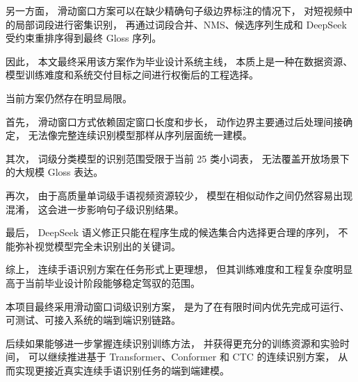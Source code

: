另一方面，
滑动窗口方案可以在缺少精确句子级边界标注的情况下，
对短视频中的局部词段进行密集识别，
再通过词段合并、NMS、候选序列生成和 DeepSeek 受约束重排序得到最终 Gloss 序列。

因此，
本文最终采用该方案作为毕业设计系统主线，
本质上是一种在数据资源、模型训练难度和系统交付目标之间进行权衡后的工程选择。

当前方案仍然存在明显局限。

首先，
滑动窗口方式依赖固定窗口长度和步长，
动作边界主要通过后处理间接确定，
无法像完整连续识别模型那样从序列层面统一建模。

其次，
词级分类模型的识别范围受限于当前 25 类小词表，
无法覆盖开放场景下的大规模 Gloss 表达。

再次，
由于高质量单词级手语视频资源较少，
模型在相似动作之间仍然容易出现混淆，
这会进一步影响句子级识别结果。

最后，
DeepSeek 语义修正只能在程序生成的候选集合内选择更合理的序列，
不能弥补视觉模型完全未识别出的关键词。

综上，
连续手语识别方案在任务形式上更理想，
但其训练难度和工程复杂度明显高于当前毕业设计阶段能够稳定驾驭的范围。

本项目最终采用滑动窗口词级识别方案，
是为了在有限时间内优先完成可运行、可测试、可接入系统的端到端识别链路。

后续如果能够进一步掌握连续识别训练方法，
并获得更充分的训练资源和实验时间，
可以继续推进基于 Transformer、Conformer 和 CTC 的连续识别方案，
从而实现更接近真实连续手语识别任务的端到端建模。